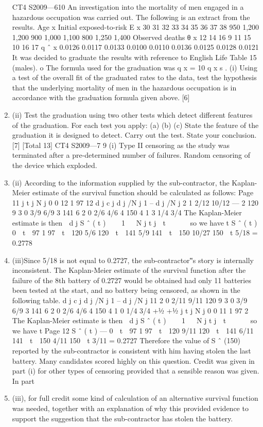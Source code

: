 \documentclass[a4paper,12pt]{article}
\begin{document}
\begin{enumerate}
\newpage
[Total 11]
CT4 S2009—610
An investigation into the mortality of men engaged in a hazardous occupation was
carried out. The following is an extract from the results.
Age x Initial
exposed-to-risk E x
30
31
32
33
34
35
36
37
38 950
1,200
1,200
900
1,000
1,100
800
1,250
1,400
Observed
deaths θ x
12
14
16
9
11
15
10
16
17
q ˆ x
0.0126
0.0117
0.0133
0.0100
0.0110
0.0136
0.0125
0.0128
0.0121
It was decided to graduate the results with reference to English Life Table 15 (males).
o
The formula used for the graduation was q x = 10 q x s .
(i) Using a test of the overall fit of the graduated rates to the data, test the
hypothesis that the underlying mortality of men in the hazardous occupation is
in accordance with the graduation formula given above.
[6]
\item (ii) Test the graduation using two other tests which detect different features of the
graduation. For each test you apply:
(a)
(b)
(c)
State the feature of the graduation it is designed to detect.
Carry out the test.
State your conclusion.
[7]
[Total 13]
CT4 S2009—7
9
(i) Type II censoring as the study was terminated after a pre-determined number
of failures. Random censoring of the device which exploded.
\item (ii) According to the information supplied by the sub-contractor, the Kaplan-
Meier estimate of the survival function should be calculated as follows:
Page 11
j t j N j
0 0 12
1 97 12
d j c j d j /N j 1 – d j /N j
2 1 2/12 10/12  — %
2 120 9 3 0 3/9 6/9
3 141 6 2 0 2/6 4/6
4 150 4 1 3 1/4 3/4
The Kaplan-Meier estimate is then
 d j
S ˆ ( t )    1 
 N j
t j  t 




so we have
t S ˆ ( t )
0  t  97 1
97  t  120 5/6
120  t  141 5/9
141  t  150 10/27
150  t 5/18 = 0.2778
\item (iii)Since 5/18 is not equal to 0.2727, the sub-contractor‟s story is internally
inconsistent. The Kaplan-Meier estimate of the survival function after the
failure of the 8th battery of 0.2727 would be obtained had only 11 batteries
been tested at the start, and no battery being censored, as shown in the
following table.
d j c j d j /N j 1 – d j /N j
11 2 0 2/11 9/11
120 9 3 0 3/9 6/9
3 141 6 2 0 2/6 4/6
4 150 4 1 0 1/4 3/4
+1⁄2 +1⁄2
j t j N j
0 0 11
1 97 2
The Kaplan-Meier estimate is then
 d j
S ˆ ( t )    1 
 N j
t j  t 




so we have
t
Page 12
S ˆ ( t )  — %
0  t  97 1
97  t  120 9/11
120  t  141 6/11
141  t  150 4/11
150  t 3/11 = 0.2727
Therefore the value of S ˆ (150) reported by the sub-contractor is consistent with
him having stolen the last battery.
Many candidates scored highly on this question. Credit was given in part (i) for other
types of censoring provided that a sensible reason was given. In part \item (iii), for full
credit some kind of calculation of an alternative survival function was needed,
together with an explanation of why this provided evidence to support the suggestion
that the sub-contractor has stolen the battery.


\end{enumerate}
\end{document}

